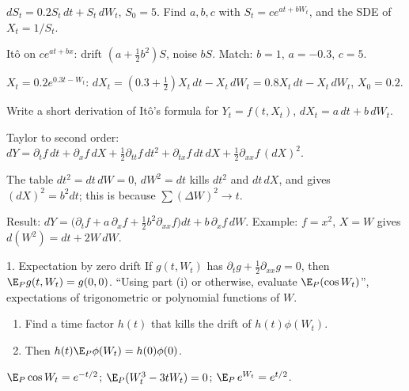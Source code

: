 \begin{problem}
$dS_t=0.2S_t\,dt+S_t\,dW_t$, $S_0=5$. Find $a,b,c$ with $S_t=ce^{at+bW_t}$, and the SDE of $X_t=1/S_t$.
\begin{steps}
  \item Itô on $ce^{at+bx}$: drift $(a+\frac12b^2)S$, noise $bS$. Match: $b=1$, $a=-0.3$, $c=5$.
  \item $X_t=0.2e^{0.3t-W_t}$: $dX_t=(0.3+\frac12)X_t\,dt-X_t\,dW_t=0.8X_t\,dt-X_t\,dW_t$, $X_0=0.2$.
\end{steps}
\end{problem}

\begin{problem}
Write a short derivation of Itô's formula for $Y_t=f(t,X_t)$, $dX_t=a\,dt+b\,dW_t$.
\begin{steps}
  \item Taylor to second order: $dY=\partial_tf\,dt+\partial_xf\,dX+\frac12\partial_{tt}f\,dt^2+\partial_{tx}f\,dt\,dX+\frac12\partial_{xx}f\,(dX)^2$.
  \item The table $dt^2=dt\,dW=0$, $dW^2=dt$ kills $dt^2$ and $dt\,dX$, and gives $(dX)^2=b^2dt$; this is because $\sum(\Delta W)^2\to t$.
  \item Result: $dY=\big(\partial_tf+a\,\partial_xf+\frac12b^2\partial_{xx}f\big)dt+b\,\partial_xf\,dW$. Example: $f=x^2$, $X=W$ gives $d(W^2)=dt+2W\,dW$.
\end{steps}
\end{problem}


\begin{card}{1. Expectation by zero drift}
\Formula
If $g(t,W_t)$ has $\partial_tg+\frac12\partial_{xx}g=0$, then $\E_Pg(t,W_t)=g(0,0)$.
\UseWhen
``Using part (i) or otherwise, evaluate $\E_P(\cos W_t)$'', expectations of trigonometric or polynomial functions of $W$.
\HowTo
\begin{enumerate}
  \item Find a time factor $h(t)$ that kills the drift of $h(t)\phi(W_t)$.
  \item Then $h(t)\E_P\phi(W_t)=h(0)\phi(0)$.
\end{enumerate}
\Caveats
{}
\begin{cardex}
$\E_P\cos W_t=e^{-t/2}$; $\E_P(W_t^3-3tW_t)=0$; $\E_P\,e^{W_t}=e^{t/2}$.
\end{cardex}
\end{card}

